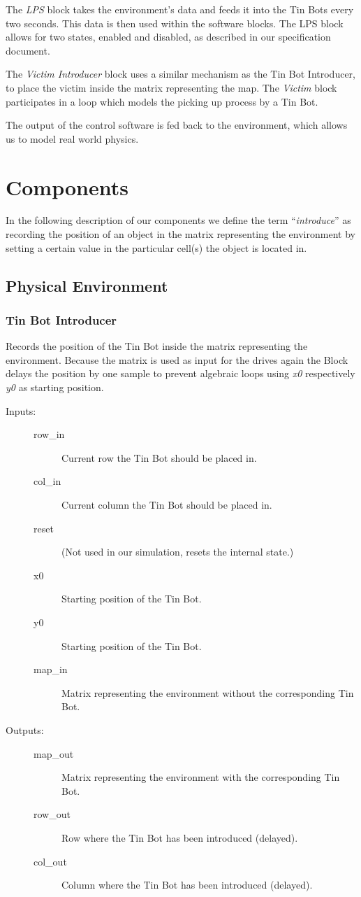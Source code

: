 \documentclass[a4paper,parskip,headheight=38pt]{scrartcl} %
\begin{document}
The \emph{LPS} block takes the environment's data and feeds it into the Tin Bots every two seconds. This data is then used within the software blocks. The LPS block allows for two states, enabled and disabled, as described in our specification document.

The \emph{Victim Introducer} block uses a similar mechanism as the Tin Bot Introducer, to place the victim inside the matrix representing the map. The \emph{Victim} block participates in a loop which models the picking up process by a Tin Bot.

The output of the control software is fed back to the environment, which allows us to model real world physics.

\section{Components}
In the following description of our components we define the term \enquote{\emph{introduce}} as recording the position of an object in the matrix representing the environment by setting a certain value in the particular cell(s) the object is located in.

\subsection{Physical Environment}
\subsubsection{Tin Bot Introducer}
Records the position of the Tin Bot inside the matrix representing the environment. Because the matrix is used as input for the drives again the Block delays the position by one sample to prevent algebraic loops using \emph{x0} respectively \emph{y0} as starting position.
\begin{description}
\item[Inputs:] \hfill
	\begin{description}
	\item[row\_in] Current row the Tin Bot should be placed in.
	\item[col\_in] Current column the Tin Bot should be placed in.
	\item[reset] (Not used in our simulation, resets the internal state.)
	\item[x0] Starting position of the Tin Bot.
	\item[y0] Starting position of the Tin Bot.
	\item[map\_in] Matrix representing the environment without the corresponding Tin Bot.
	\end{description}
\item[Outputs:] \hfill
	\begin{description}
	\item[map\_out] Matrix representing the environment with the corresponding Tin Bot.
	\item[row\_out] Row where the Tin Bot has been introduced (delayed).
	\item[col\_out] Column where the Tin Bot has been introduced (delayed).
	\end{description}
\end{description}
\end{document}

